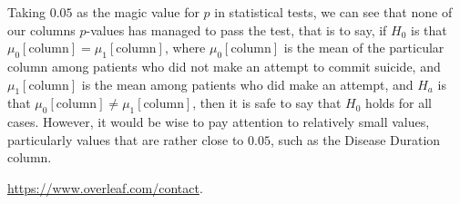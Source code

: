 \documentclass{article}
\begin{document}
Taking $0.05$ as the magic value for $p$ in statistical tests, we can see that none of our columns $p$-values has managed to pass the test, that is to say, if $H_0$ is that $\mu_0[\text{column}]=\mu_1[\text{column}]$, where $\mu_0[\text{column}]$ is the mean of the particular column among patients who did not make an attempt to commit suicide, and $\mu_1[\text{column}]$ is the mean among patients who did make an attempt, and $H_a$ is that $\mu_0[\text{column}]\neq\mu_1[\text{column}]$, then it is safe to say that $H_0$ holds for all cases. However, it would be wise to pay attention to relatively small values, particularly values that are rather close to $0.05$, such as the Disease Duration column.


\url{https://www.overleaf.com/contact}.



\end{document}
